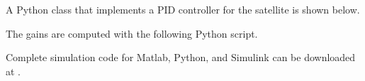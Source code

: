 A Python class that implements a PID controller for the satellite is shown below.


The gains are computed with the following Python script. 


Complete simulation code for Matlab, Python, and Simulink can be downloaded at .


	
%

 
